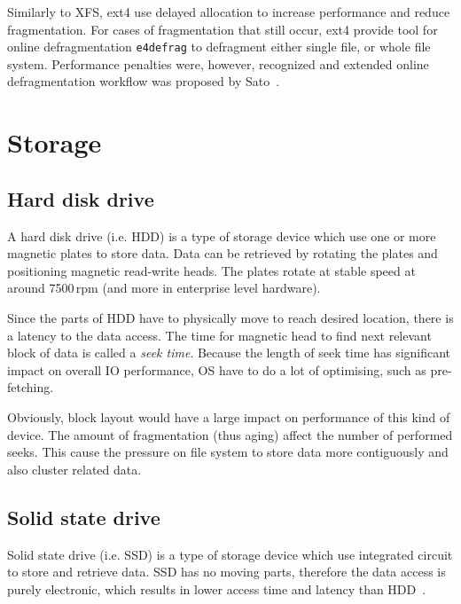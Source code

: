 \documentclass[
  color, %
  table, %
  lof,   %
  lot,   %
]{fithesis3}
\begin{document}
Similarly to XFS, ext4 use delayed allocation to increase performance and reduce fragmentation. For cases of fragmentation that still occur, ext4 provide tool for online defragmentation \texttt{e4defrag} to defragment either single file, or whole file system. Performance penalties were, however, recognized and extended online defragmentation workflow was proposed by Sato~\cite{sato2007:ext4}.




\section{Storage}
\subsection{Hard disk drive}
A hard disk drive (i.e. HDD) is a type of storage device which use one or more magnetic plates to store data. Data can be retrieved by rotating the plates and positioning magnetic read-write heads. The plates rotate at stable speed at around 7500\,rpm (and more in enterprise level hardware).

Since the parts of HDD have to physically move to reach desired location, there is a latency to the data access. The time for magnetic head to find next relevant block of data is called a \emph{seek time}. Because the length of seek time has significant impact on overall IO performance, OS have to do a lot of optimising, such as pre-fetching.

Obviously, block layout would have a large impact on performance of this kind of device. The amount of fragmentation (thus aging) affect the number of performed seeks. This cause the pressure on file system to store data more contiguously and also cluster related data.

\subsection{Solid state drive}
Solid state drive (i.e. SSD) is  a type of storage device which use integrated circuit to store and retrieve data. SSD has no moving parts, therefore the data access is purely electronic, which results in lower access time and latency than HDD~\cite{kasavajhala2011solid}.
\end{document}
